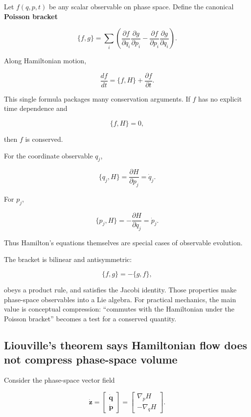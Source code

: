 Let \(f(q,p,t)\) be any scalar observable on phase space. Define the canonical \textbf{Poisson bracket}

\[
\boxed{
\{f,g\}
=
\sum_i
\left(
\frac{\partial f}{\partial q_i}
\frac{\partial g}{\partial p_i}
-
\frac{\partial f}{\partial p_i}
\frac{\partial g}{\partial q_i}
\right)
}.
\]

Along Hamiltonian motion,

\[
\boxed{
\frac{df}{dt}
=
\{f,H\}
+
\frac{\partial f}{\partial t}
}.
\]

This single formula packages many conservation arguments. If \(f\) has no explicit time dependence and

\[
\{f,H\}=0,
\]

then \(f\) is conserved.

For the coordinate observable \(q_j\),

\[
\{q_j,H\}
=
\frac{\partial H}{\partial p_j}
=
\dot q_j.
\]

For \(p_j\),

\[
\{p_j,H\}
=
-
\frac{\partial H}{\partial q_j}
=
\dot p_j.
\]

Thus Hamilton's equations themselves are special cases of observable evolution.

The bracket is bilinear and antisymmetric:

\[
\{f,g\}=-\{g,f\},
\]

obeys a product rule, and satisfies the Jacobi identity. Those properties make phase-space observables into a Lie algebra. For practical mechanics, the main value is conceptual compression: ``commutes with the Hamiltonian under the Poisson bracket'' becomes a test for a conserved quantity.

\subsection{Liouville's theorem says Hamiltonian flow does not compress phase-space volume}\label{02-foundations-ii-ch025-liouvilles-theorem-says-hamiltonian-flow-does-not-compress-phase-space-volume}

Consider the phase-space vector field

\[
\dot{\mathbf z}
=
\begin{bmatrix}
\dot{\mathbf q}\\
\dot{\mathbf p}
\end{bmatrix}
=
\begin{bmatrix}
\nabla_pH\\
-\nabla_qH
\end{bmatrix}.
\]


